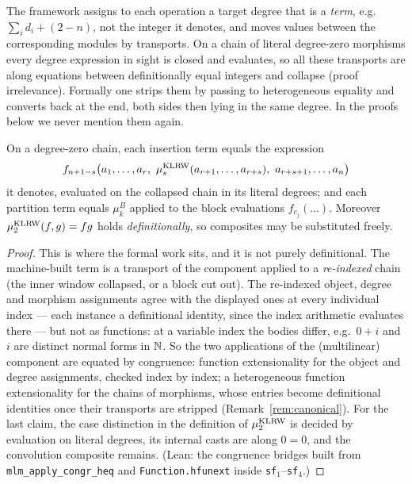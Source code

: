 \begin{remark}\label{rem:canonical}
  The framework assigns to each operation a target degree that is a
  \emph{term}, e.g.\ $\sum_i d_i + (2-n)$, not the integer it denotes, and
  moves values between the corresponding modules by transports. On a chain of
  literal degree-zero morphisms every degree expression in sight is closed
  and evaluates, so all these transports are along equations between
  definitionally equal integers and collapse (proof irrelevance). Formally
  one strips them by passing to heterogeneous equality and converts back at
  the end, both sides then lying in the same degree. In the proofs below we
  never mention them again.
\end{remark}

\begin{lemma}\label{lem:normal-form}
  On a degree-zero chain, each insertion term equals the expression
  \[
    f_{n+1-s}\big(a_1, \dots, a_r,\
      \mu^{\operatorname{KLRW}}_s(a_{r+1}, \dots, a_{r+s}),\ a_{r+s+1}, \dots, a_n\big)
  \]
  it denotes, evaluated on the collapsed chain in its literal degrees; and
  each partition term equals $\mu^B_k$ applied to the block evaluations
  $f_{c_j}(\dots)$. Moreover $\mu^{\operatorname{KLRW}}_2(f,g) = fg$ holds
  \emph{definitionally}, so composites may be substituted freely.
\end{lemma}

\begin{proof}
  This is where the formal work sits, and it is not purely definitional. The
  machine-built term is a transport of the component applied to a
  \emph{re-indexed} chain (the inner window collapsed, or a block cut out).
  The re-indexed object, degree and morphism assignments agree with the
  displayed ones at every individual index --- each instance a definitional
  identity, since the index arithmetic evaluates there --- but not as
  functions: at a variable index the bodies differ, e.g.\ $0 + i$ and $i$
  are distinct normal forms in $\mathbb{N}$. So the two applications of the
  (multilinear) component are equated by congruence: function extensionality
  for the object and degree assignments, checked index by index; a
  heterogeneous function extensionality for the chains of morphisms, whose
  entries become definitional identities once their transports are stripped
  (Remark~\ref{rem:canonical}). For the last claim, the case distinction in
  the definition of $\mu^{\operatorname{KLRW}}_2$ is decided by evaluation on literal
  degrees, its internal casts are along $0 = 0$, and the convolution
  composite remains. (Lean: the congruence bridges built from
  \texttt{mlm\_apply\_congr\_heq} and \texttt{Function.hfunext} inside
  \texttt{sf}$_1$--\texttt{sf}$_4$.)
\end{proof}

